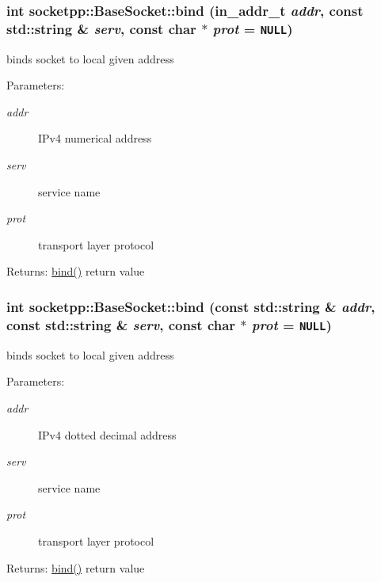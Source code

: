 \begin{CompactItemize}
\hypertarget{classsocketpp_1_1BaseSocket_aab800bcb5ee48cd4410ae2b9ed83e23}{
\subsubsection[{bind}]{\setlength{\rightskip}{0pt plus 5cm}int socketpp::BaseSocket::bind (in\_\-addr\_\-t {\em addr}, \/  const std::string \& {\em serv}, \/  const char $\ast$ {\em prot} = {\tt NULL})}}
\label{classsocketpp_1_1BaseSocket_aab800bcb5ee48cd4410ae2b9ed83e23}


binds socket to local given address 

\begin{Desc}
\item[Parameters:]
\begin{description}
\item[{\em addr}]IPv4 numerical address \item[{\em serv}]service name \item[{\em prot}]transport layer protocol \end{description}
\end{Desc}
\begin{Desc}
\item[Returns:]\hyperlink{classsocketpp_1_1BaseSocket_78c2a8e6a5c7dfbc708c9cd637e88e51}{bind()} return value \end{Desc}
\hypertarget{classsocketpp_1_1BaseSocket_4775f13f8e1cceaaed40106162b2149f}{
\subsubsection[{bind}]{\setlength{\rightskip}{0pt plus 5cm}int socketpp::BaseSocket::bind (const std::string \& {\em addr}, \/  const std::string \& {\em serv}, \/  const char $\ast$ {\em prot} = {\tt NULL})}}
\label{classsocketpp_1_1BaseSocket_4775f13f8e1cceaaed40106162b2149f}


binds socket to local given address 

\begin{Desc}
\item[Parameters:]
\begin{description}
\item[{\em addr}]IPv4 dotted decimal address \item[{\em serv}]service name \item[{\em prot}]transport layer protocol \end{description}
\end{Desc}
\begin{Desc}
\item[Returns:]\hyperlink{classsocketpp_1_1BaseSocket_78c2a8e6a5c7dfbc708c9cd637e88e51}{bind()} return value \end{Desc}
\hypertarget{classsocketpp_1_1BaseSocket_d3df73f534900d40f9dff26171ec93b5}{
}
\end{CompactItemize}
